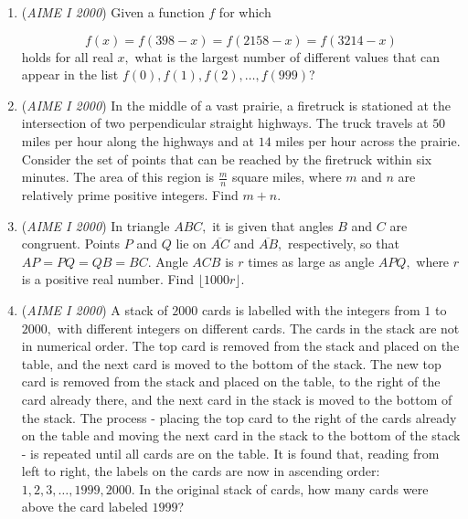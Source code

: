\begin{enumerate}
 

	\item (\textit{AIME I 2000}) Given a function $f$ for which

 \[f(x) = f(398 - x) = f(2158 - x) = f(3214 - x)\]
holds for all real $x,$ what is the largest number of different values that can appear in the list $f(0),f(1),f(2),\ldots,f(999)$?


 

	\item (\textit{AIME I 2000}) In the middle of a vast prairie, a firetruck is stationed at the intersection of two perpendicular straight highways. The truck travels at $50$ miles per hour along the highways and at $14$ miles per hour across the prairie. Consider the set of points that can be reached by the firetruck within six minutes. The area of this region is $\frac{m}{n}$ square miles, where $m$ and $n$ are relatively prime positive integers. Find $m + n$.


 

	\item (\textit{AIME I 2000}) In triangle $ABC,$ it is given that angles $B$ and $C$ are congruent. Points $P$ and $Q$ lie on $\overline{AC}$ and $\overline{AB},$ respectively, so that $AP = PQ = QB = BC.$ Angle $ACB$ is $r$ times as large as angle $APQ,$ where $r$ is a positive real number. Find $\lfloor 1000r \rfloor$.


 

	\item (\textit{AIME I 2000}) A stack of $2000$ cards is labelled with the integers from $1$ to $2000,$ with different integers on different cards. The cards in the stack are not in numerical order. The top card is removed from the stack and placed on the table, and the next card is moved to the bottom of the stack. The new top card is removed from the stack and placed on the table, to the right of the card already there, and the next card in the stack is moved to the bottom of the stack. The process - placing the top card to the right of the cards already on the table and moving the next card in the stack to the bottom of the stack - is repeated until all cards are on the table. It is found that, reading from left to right, the labels on the cards are now in ascending order: $1,2,3,\ldots,1999,2000.$ In the original stack of cards, how many cards were above the card labeled $1999$?


 

\end{enumerate}